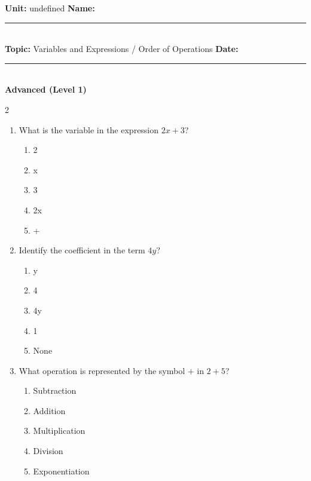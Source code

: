 \documentclass[10pt]{article}
\begin{document}
\enlargethispage{2.5cm}

\begin{tcolorbox}[colback=mainblue!5, colframe=mainblue, sharp corners, boxrule=0.5pt]
    \small \textbf{Unit:} undefined \hfill \textbf{Name:} \rule{3cm}{0.4pt} \\
    \small \textbf{Topic:} Variables and Expressions / Order of Operations \hfill \textbf{Date:} \rule{2cm}{0.4pt} \\
    \centering \textbf{\large Advanced (Level 1)}
\end{tcolorbox}

\vspace{0.2cm}

\begin{multicols}{2}
\begin{enumerate}[label=\textbf{Q\arabic*.}, leftmargin=*, itemsep=6pt, parsep=0pt]

  \item \small What is the variable in the expression $2x + 3$?
  \begin{enumerate}[label=(\Alph*), leftmargin=0.6cm, nosep, itemsep=2pt]
    \item 2
    \item x
    \item 3
    \item 2x
    \item + 
  \end{enumerate}

  \item \small Identify the coefficient in the term $4y$?
  \begin{enumerate}[label=(\Alph*), leftmargin=0.6cm, nosep, itemsep=2pt]
    \item y
    \item 4
    \item 4y
    \item 1
    \item None
  \end{enumerate}

  \item \small What operation is represented by the symbol $+$ in $2 + 5$?
  \begin{enumerate}[label=(\Alph*), leftmargin=0.6cm, nosep, itemsep=2pt]
    \item Subtraction
    \item Addition
    \item Multiplication
    \item Division
    \item Exponentiation
  \end{enumerate}


\end{enumerate}
\end{multicols}
\end{document}

